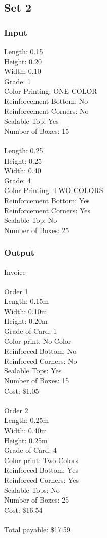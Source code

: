 \documentclass[12pt]{article}
\begin{document}
\subsection{Set 2}
\subsubsection{Input}
Length: 0.15\\
Height: 0.20\\
Width: 0.10\\
Grade: 1\\
Color Printing: ONE COLOR\\
Reinforcement Bottom: No\\
Reinforcement Corners: No\\
Sealable Top: Yes\\
Number of Boxes: 15\\
\\
Length: 0.25\\
Height: 0.25\\
Width: 0.40\\
Grade: 4\\
Color Printing: TWO COLORS\\
Reinforcement Bottom: Yes\\
Reinforcement Corners: Yes\\
Sealable Top: No\\
Number of Boxes: 25\\
\subsubsection{Output}
Invoice\\
\\
Order 1\\
Length: 0.15m\\
Width: 0.10m\\
Height: 0.20m\\
Grade of Card: 1\\
Color print: No Color\\
Reinforced Bottom: No\\
Reinforced Corners: No\\
Sealable Tops: Yes\\
Number of Boxes: 15\\
Cost: \$1.05\\
\\
Order 2\\
Length: 0.25m\\
Width: 0.40m\\
Height: 0.25m\\
Grade of Card: 4\\
Color print: Two Colors\\
Reinforced Bottom: Yes\\
Reinforced Corners: Yes\\
Sealable Tops: No\\
Number of Boxes: 25\\
Cost: \$16.54\\
\\
Total payable: \$17.59\\
\end{document}
